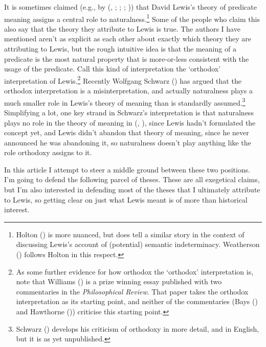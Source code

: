 \documentclass[
  11pt,
  letterpaper,
  DIV=11,
  numbers=noendperiod,
  twoside]{scrartcl}
\begin{document}
It is sometimes claimed (e.g., by (, ;
;
;
)) that David
Lewis's theory of predicate meaning assigns a central role to
naturalness.\footnote{Holton () is
  more nuanced, but does tell a similar story in the context of
  discussing Lewis's account of (potential) semantic indeterminacy.
  Weatherson () follows Holton in
  this respect.} Some of the people who claim this also say that the
theory they attribute to Lewis is true. The authors I have mentioned
aren't as explicit as each other about exactly which theory they are
attributing to Lewis, but the rough intuitive idea is that the meaning
of a predicate is the most natural property that is more-or-less
consistent with the usage of the predicate. Call this kind of
interpretation the `orthodox' interpretation of Lewis.\footnote{As some
  further evidence for how orthodox the `orthodox' interpretation is,
  note that Williams () is a prize
  winning essay published with two commentaries in the
  \emph{Philosophical Review}. That paper takes the orthodox
  interpretation as its starting point, and neither of the commentaries
  (Bays () and Hawthorne
  ()) criticise this starting point.}
Recently Wolfgang Schwarz () has
argued that the orthodox interpretation is a misinterpretation, and
actually naturalness plays a much smaller role in Lewis's theory of
meaning than is standardly assumed.\footnote{Schwarz
  () develops his criticism of orthodoxy
  in more detail, and in English, but it is as yet unpublished.}
Simplifying a lot, one key strand in Schwarz's interpretation is that
naturalness plays no role in the theory of meaning in
(,
), since Lewis hadn't formulated the
concept yet, and Lewis didn't abandon that theory of meaning, since he
never announced he was abandoning it, so naturalness doesn't play
anything like the role orthodoxy assigns to it.

In this article I attempt to steer a middle ground between these two
positions. I'm going to defend the following parcel of theses. These are
all exegetical claims, but I'm also interested in defending most of the
theses that I ultimately attribute to Lewis, so getting clear on just
what Lewis meant is of more than historical interest.
\end{document}
